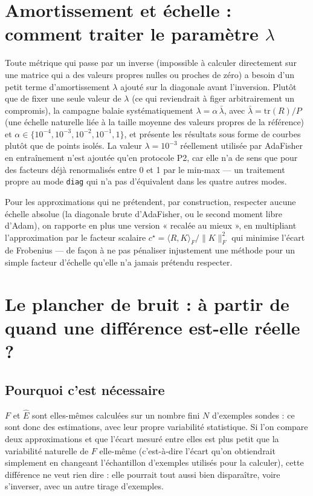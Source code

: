\documentclass[11pt,a4paper]{article}
\begin{document}
\section{Amortissement et échelle : comment traiter le paramètre $\lambda$}

Toute métrique qui passe par un inverse (impossible à calculer directement sur une matrice qui a des
valeurs propres nulles ou proches de zéro) a besoin d'un petit terme d'amortissement $\lambda$
ajouté sur la diagonale avant l'inversion. Plutôt que de fixer une seule valeur de $\lambda$
(ce qui reviendrait à figer arbitrairement un compromis), la campagne balaie systématiquement
$\lambda=\alpha\,\bar\lambda$, avec $\bar\lambda=\mathrm{tr}(R)/P$ (une échelle naturelle liée à la
taille moyenne des valeurs propres de la référence) et $\alpha\in\{10^{-4},10^{-3},10^{-2},10^{-1},1\}$,
et présente les résultats sous forme de courbes plutôt que de points isolés. La valeur
$\lambda=10^{-3}$ réellement utilisée par AdaFisher en entraînement n'est ajoutée qu'en protocole
P2, car elle n'a de sens que pour des facteurs déjà renormalisés entre 0 et 1 par le min-max — un
traitement propre au mode \texttt{diag} qui n'a pas d'équivalent dans les quatre autres modes.

Pour les approximations qui ne prétendent, par construction, respecter aucune échelle absolue
(la diagonale brute d'AdaFisher, ou le second moment libre d'Adam), on rapporte en plus une version
« recalée au mieux », en multipliant l'approximation par le facteur scalaire
$c^\star=\langle R,K\rangle_F/\|K\|_F^2$ qui minimise l'écart de Frobenius — de façon à ne pas
pénaliser injustement une méthode pour un simple facteur d'échelle qu'elle n'a jamais prétendu
respecter.

\section{Le plancher de bruit : à partir de quand une différence est-elle réelle ?}

\subsection{Pourquoi c'est nécessaire}

$F$ et $\hat E$ sont elles-mêmes calculées sur un nombre fini $N$ d'exemples sondes : ce sont donc
des estimations, avec leur propre variabilité statistique. Si l'on compare deux approximations et
que l'écart mesuré entre elles est plus petit que la variabilité naturelle de $F$ elle-même
(c'est-à-dire l'écart qu'on obtiendrait simplement en changeant l'échantillon d'exemples utilisés
pour la calculer), cette différence ne veut rien dire : elle pourrait tout aussi bien disparaître,
voire s'inverser, avec un autre tirage d'exemples.
\end{document}
